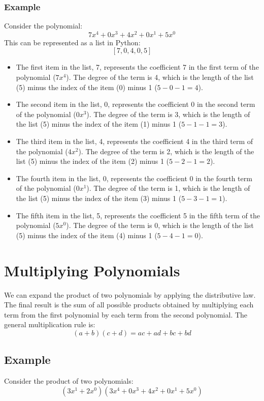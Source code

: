 \documentclass{article}
\begin{document}
\subsubsection*{Example}
Consider the polynomial:
$$ 7x^4 + 0x^3 + 4x^2 + 0x^1 + 5x^0 $$
This can be represented as a list in Python:
$$ [7, 0, 4, 0, 5] $$

\begin{itemize}
    \item The first item in the list, 7, represents the coefficient 7 in the first term of the polynomial (\( 7x^4 \)). The degree of the term is 4, which is the length of the list (5) minus the index of the item (0) minus 1 (\( 5 - 0 - 1 = 4 \)).
    \item The second item in the list, 0, represents the coefficient 0 in the second term of the polynomial (\( 0x^3 \)). The degree of the term is 3, which is the length of the list (5) minus the index of the item (1) minus 1 (\( 5 - 1 - 1 = 3 \)).
    \item The third item in the list, 4, represents the coefficient 4 in the third term of the polynomial (\( 4x^2 \)). The degree of the term is 2, which is the length of the list (5) minus the index of the item (2) minus 1 (\( 5 - 2 - 1 = 2 \)).
    \item The fourth item in the list, 0, represents the coefficient 0 in the fourth term of the polynomial (\( 0x^1 \)). The degree of the term is 1, which is the length of the list (5) minus the index of the item (3) minus 1 (\( 5 - 3 - 1 = 1 \)).
    \item The fifth item in the list, 5, represents the coefficient 5 in the fifth term of the polynomial (\( 5x^0 \)). The degree of the term is 0, which is the length of the list (5) minus the index of the item (4) minus 1 (\( 5 - 4 - 1 = 0 \)).
\end{itemize}

\section*{Multiplying Polynomials}

We can expand the product of two polynomials by applying the distributive law. The final result is the sum of all possible products obtained by multiplying each term from the first polynomial by each term from the second polynomial. The general multiplication rule is:
$$ (a + b)(c + d) = ac + ad + bc + bd $$ 

\subsection*{Example}
Consider the product of two polynomials:
$$ (3x^1+2x^0)(3x^4 + 0x^3 + 4x^2 + 0x^1 + 5x^0) $$
\end{document}
